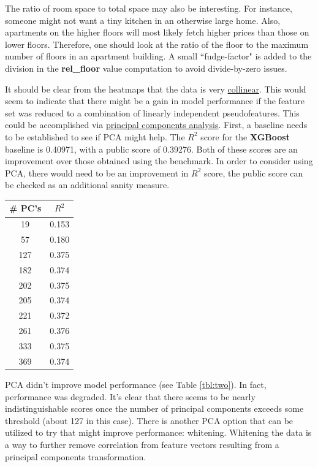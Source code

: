 \documentclass[12pt]{article}
\theoremstyle{plain} %
\theoremstyle{definition} %
\theoremstyle{remark} %
\begin{document}
\par The ratio of room space to total space may also be interesting.  For instance, someone might not want a tiny kitchen in an otherwise large home.  Also, apartments on the higher floors will most likely fetch higher prices than those on lower floors.  Therefore, one should look at the ratio of the floor to the maximum number of floors in an apartment building.  A small ``fudge-factor" is added to the division in the \textbf{rel\_floor} value computation to avoid divide-by-zero issues.

\par It should be clear from the heatmaps that the data is very \href{https://www.kaggle.com/robertoruiz/dealing-with-multicollinearity}{collinear}.  This would seem to indicate that there might be a gain in model performance if the feature set was reduced to a combination of linearly independent pseudofeatures.  This could be accomplished via \href{http://setosa.io/ev/principal-component-analysis/}{principal components analysis}.  First, a baseline needs to be established to see if PCA might help.  The $R^2$ score for the \textbf{XGBoost} baseline is 0.40971, with a public score of 0.39276.  Both of these scores are an improvement over those obtained using the benchmark.  In order to consider using PCA, there would need to be an improvement in $R^2$ score, the public score can be checked as an additional sanity measure.

\begin{center}
\begin{tabular}{c | c }
\hline
\# PC's & $R^2$ \\ \hline
 19 & 0.153 \\ \hline
57 & 0.180 \\ \hline
127 & 0.375 \\ \hline
182 & 0.374 \\ \hline
202 & 0.375 \\ \hline
205 & 0.374 \\ \hline
221 & 0.372 \\ \hline
261 & 0.376 \\ \hline
333 & 0.375 \\ \hline
369 & 0.374 \\ \hline
\end{tabular}
\label{tbl:two}
\end{center}

\par PCA didn't improve model performance (see Table \ref{tbl:two}).  In fact, performance was degraded.  It's clear that there seems to be nearly indistinguishable scores once the number of principal components exceeds some threshold (about 127 in this case).  There is another PCA option that can be utilized to try that might improve performance:  whitening.  Whitening the data is a way to further remove correlation from feature vectors resulting from a principal components transformation.
\end{document}
